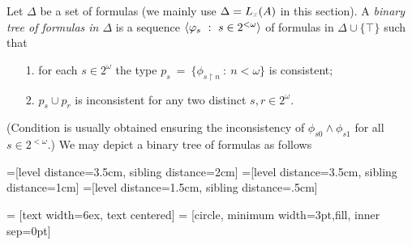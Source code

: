 \documentclass[creche.tex]{subfiles}
\begin{document}
\begin{definition}\label{def_tree_formulas}
Let $\Delta$ be a set of formulas (we mainly use $\Delta=L_{\color{brown} x}(A)$ in this section). A \emph{binary tree of formulas in $\Delta$\/} is a sequence $\<\phi_s\ :\ s\in2^{<\omega}\>$ of formulas in $\Delta\cup\{\top\}$ such that\nobreak
\begin{itemize}
\item[1.] for each $s\in 2^\omega$ the type $p_s\ =\ \big\{\phi_{s\restriction n}\ :\ n<\omega\big\}$ is consistent;
\item[2.] $p_s\cup p_r$ is inconsistent for any two distinct $s,r\in 2^\omega$.
\end{itemize}
(Condition  is usually obtained ensuring the inconsistency of $\phi_{s0}\wedge\phi_{s1}$ for all $s\in2^{<\omega}$.) We may depict a binary tree of formulas as follows


=[level distance=3.5cm, sibling distance=2cm]
=[level distance=3.5cm, sibling distance=1cm]
=[level distance=1.5cm, sibling distance=.5cm]

 = [text width=6ex, text centered]
 = [circle, minimum width=3pt,fill, inner sep=0pt]

\def\leaf{. . .}


\end{definition}
\end{document}
